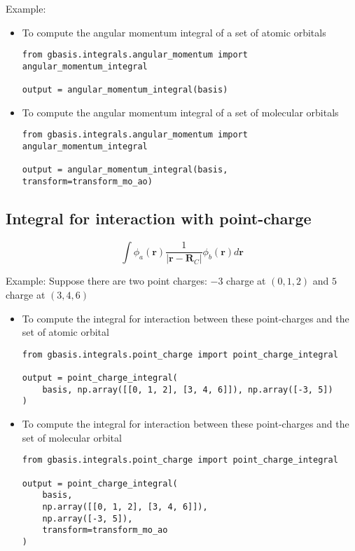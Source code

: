 \documentclass[letterpaper]{article}
\begin{document}
Example:
\begin{itemize}
\item To compute the angular momentum integral of a set of atomic orbitals
  \begin{lstlisting}[xleftmargin=-25pt]
from gbasis.integrals.angular_momentum import angular_momentum_integral

output = angular_momentum_integral(basis)
\end{lstlisting}
\item To compute the angular momentum integral of a set of molecular orbitals
  \begin{lstlisting}[xleftmargin=-25pt]
from gbasis.integrals.angular_momentum import angular_momentum_integral

output = angular_momentum_integral(basis, transform=transform_mo_ao)
\end{lstlisting}
\end{itemize}
\subsection{Integral for interaction with point-charge}
\begin{equation}
  \label{eq:point_charge}
  \int \phi_a(\mathbf{r}) \frac{1}{|\mathbf{r} - \mathbf{R}_C|} \phi_b(\mathbf{r}) d\mathbf{r}
\end{equation}

Example:
Suppose there are two point charges: $-3$ charge at $(0, 1, 2)$ and $5$ charge
at $(3, 4, 6)$
\begin{itemize}
\item To compute the integral for interaction between these point-charges and
  the set of atomic orbital
  \begin{lstlisting}[xleftmargin=-25pt]
from gbasis.integrals.point_charge import point_charge_integral

output = point_charge_integral(
    basis, np.array([[0, 1, 2], [3, 4, 6]]), np.array([-3, 5])
)
\end{lstlisting}
\item To compute the integral for interaction between these point-charges and
  the set of molecular orbital
  \begin{lstlisting}[xleftmargin=-25pt]
from gbasis.integrals.point_charge import point_charge_integral

output = point_charge_integral(
    basis,
    np.array([[0, 1, 2], [3, 4, 6]]),
    np.array([-3, 5]),
    transform=transform_mo_ao
)
\end{lstlisting}
\end{itemize}
\end{document}
